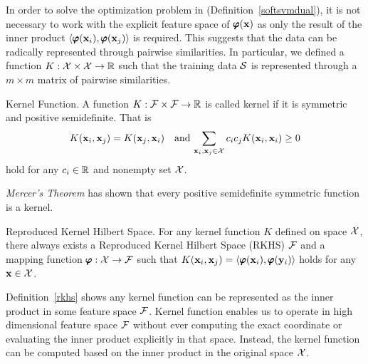 {In order to solve the optimization problem in (Definition~\ref{softsvmdual}), it is not necessary to work with the explicit feature space of $\pmb \varphi(\mathbf {x})$ as only the result of the inner product $\langle \pmb \varphi(\mathbf {x}_i), \pmb \varphi(\mathbf {x}_j) \rangle$ is required.
This suggests that the data can be radically represented through pairwise similarities.
In particular, we defined a function $K:\mathcal{X}\times\mathcal{X}\rightarrow\mathbb{R}$ such that the training data $\mathcal{S}$ is represented through a $m\times m$ matrix of pairwise similarities.
\begin{definition}{Kernel Function.}
 	A function $K:\mathcal{F}\times\mathcal{F}\rightarrow\mathbb{R}$ is called kernel if it is symmetric and positive semidefinite. That is 
\begin{align*}
	K(\mathbf {x}_i,\mathbf {x}_j) = K(\mathbf {x}_j,\mathbf {x}_i)\quad \text{and}\, \sum_{\mathbf {x}_i,\mathbf {x}_j\in\mathcal{X}}c_ic_jK(\mathbf {x}_i,\mathbf {x}_i)\ge0
\end{align*}
hold for any $c_i\in\mathbb{R}$ and nonempty set $\mathcal{X}$.
\end{definition}
\textit{Mercer's Theorem} \citep{taylor04} has shown that every positive semidefinite symmetric function is a kernel.
\begin{definition}{Reproduced Kernel Hilbert Space.} \label{rkhs}
	For any kernel function $K$ defined on space $\mathcal{X}$, there always exists a Reproduced Kernel Hilbert Space (RKHS) $\mathcal{F}$ and a mapping function $\pmb \varphi:\mathcal{X}\rightarrow\mathcal{F}$ such that $K(\mathbf {x}_i,\mathbf {x}_j)=\langle \pmb \varphi(\mathbf {x}_i), \pmb \varphi(\mathbf {y}_i) \rangle$ holds for any $\mathbf {x}\in\mathcal{X}$.
\end{definition}
Definition~\ref{rkhs} shows any kernel function can be represented as the inner product in some feature space $\mathcal{F}$.
Kernel function enables us to operate in high dimensional feature space $\mathcal{F}$ without ever computing the exact coordinate or evaluating the inner product explicitly in that space.
Instead, the kernel function can be computed based on the inner product in the original space $\mathcal{X}$.

}
